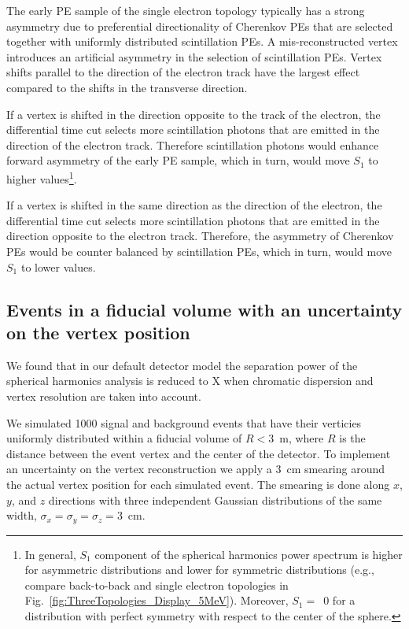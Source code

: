 The early PE sample of the single electron topology typically has a strong asymmetry due
to preferential directionality of Cherenkov PEs that are selected together with uniformly distributed scintillation PEs. 
A mis-reconstructed vertex introduces an artificial asymmetry in the selection of scintillation PEs. Vertex shifts parallel to the direction of 
the electron track have the largest effect compared to the shifts in the transverse direction. 

If a vertex is shifted in the direction opposite to the track of the electron, the differential time cut selects more scintillation 
photons that are emitted in the direction of the electron track. Therefore scintillation photons would enhance forward asymmetry of the early PE
sample, which in turn, would move $S_1$ to higher values\footnote{In general, $S_1$ component of the
spherical harmonics power spectrum is higher for asymmetric distributions and lower for symmetric distributions (e.g., compare back-to-back
and single electron topologies in Fig.~\ref{fig:ThreeTopologies_Display_5MeV}). Moreover, $S_1=$~0 for a distribution with perfect symmetry
with respect to the center of the sphere.}.

If a vertex is shifted in the same direction as the direction of the electron, the differential time cut selects more scintillation
photons that are emitted in the direction opposite to the electron track. Therefore, the asymmetry of Cherenkov PEs would be counter
balanced by scintillation PEs, which in turn, would move $S_1$ to lower values.


\subsection{Events in a fiducial volume with an uncertainty on the vertex position}
We found that in our default detector model the separation power of the spherical harmonics analysis is reduced to X when
chromatic dispersion and vertex resolution are taken into account.

We simulated 1000 signal and background events that have their verticies uniformly distributed within a fiducial volume of $R<3$~m, 
where $R$ is the distance between the event vertex and the center of the detector. To implement an uncertainty on the vertex 
reconstruction we apply a 3~cm smearing around the actual vertex position for each simulated event. The smearing is done along $x$, $y$, 
and $z$ directions with three independent Gaussian distributions of the same width, $\sigma_x = \sigma_y = \sigma_z =$3~cm.

